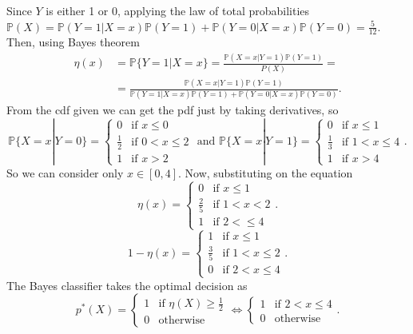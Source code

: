 \documentclass[11pt, english]{article}
\begin{document}
Since $Y$ is either 1 or 0, applying the law of total probabilities $\mathbb{P}(X)=\mathbb{P}(Y=1|X=x)\mathbb{P}(Y=1)+\mathbb{P}(Y=0|X=x)\mathbb{P}(Y=0)=\frac{5}{12}$. Then, using Bayes theorem \begin{align}
	\eta(x) & =\mathbb{P}\{Y=1|X=x\}=\frac{\mathbb{P}(X=x|Y=1)\mathbb{P}(Y=1)}{P(X)}=\\
	&=\frac{\mathbb{P}(X=x|Y=1)\mathbb{P}(Y=1)}{\mathbb{P}(Y=1|X=x)\mathbb{P}(Y=1)+\mathbb{P}(Y=0|X=x)\mathbb{P}(Y=0)}.
\end{align}
From the cdf given we can get the pdf just by taking derivatives, so
$$\mathbb{P}\{X= x|Y=0\}=\left\{\begin{array}{ll}
0 & \text{if }x\leq 0\\
\frac{1}{2} & \text{if } 0< x\leq 2\\
1 & \text{if } x>2
\end{array}\right.\text{ and }\mathbb{P}\{X= x|Y=1\}=\left\{\begin{array}{ll}
0 & \text{if } x\leq 1\\
\frac{1}{3} & \text{if } 1< x\leq 4\\
1 & \text{if } x>4
\end{array}\right..$$
So we can consider only $x\in[0,4]$. Now, substituting on the equation
\begin{equation}
	\eta(x)=\left\{\begin{array}{ll}
	0 & \text{if }x\leq 1\\
	\frac{2}{5} & \text{if } 1<x<2\\
	1 & \text{if } 2<\leq 4
	\end{array}\right..
\end{equation}
\begin{equation}
1-\eta(x)=\left\{\begin{array}{ll}
1 & \text{if }x\leq 1\\
\frac{3}{5} & \text{if } 1<x\leq2\\
0 & \text{if } 2<x\leq 4
\end{array}\right..
\end{equation}
The Bayes classifier takes the optimal decision as 
\begin{equation}
	p^*(X)=\left\{\begin{array}{ll}
	1 & \text{if } \eta(X)\geq \frac{1}{2}\\
	0 & \text{otherwise}
	\end{array}\right.\Leftrightarrow\left\{\begin{array}{ll}
	1 & \text{if } 2<x\leq 4\\
	0 & \text{otherwise}
	\end{array}\right..
\end{equation}
\end{document}
